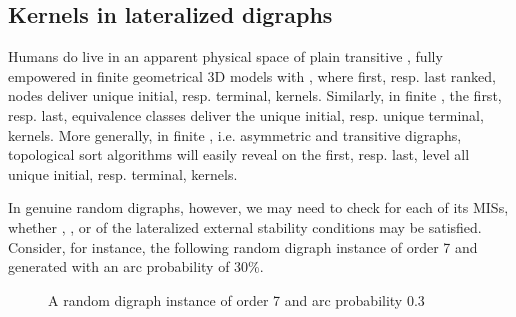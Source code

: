 \documentclass[a4paper,12pt,english]{sphinxhowto}
\let\sphinxpxdimen\pdfpxdimen\else\newdimen\sphinxpxdimen
\begin{document}
\subsection{Kernels in lateralized digraphs}
\label{\detokenize{tutorial:kernels-in-lateralized-digraphs}}
Humans do live in an apparent physical space of plain transitive , fully empowered in finite geometrical 3D models with , where first, resp. last ranked, nodes deliver unique initial, resp. terminal, kernels. Similarly, in finite , the first, resp. last, equivalence classes deliver the unique initial, resp. unique terminal, kernels. More generally, in finite , i.e. asymmetric and transitive digraphs, topological sort algorithms will easily reveal on the first, resp. last, level all unique initial, resp. terminal, kernels.

In genuine random digraphs, however, we may need to check for each of its MISs, whether , , or  of the lateralized external stability conditions may be satisfied. Consider, for instance, the following random digraph instance of order 7 and generated with an arc probability of 30\%.

\begin{sphinxVerbatim}[commandchars=\\\{\},numbers=left,firstnumber=1,stepnumber=1]
   
  
\end{sphinxVerbatim}

\begin{figure}[H]
\centering
\capstart

\noindent\sphinxincludegraphics[width=300\sphinxpxdimen]{{randomLaterality}.png}
\caption{A random digraph instance of order 7 and arc probability 0.3}\label{\detokenize{tutorial:randomlaterality}}\end{figure}
\end{document}
